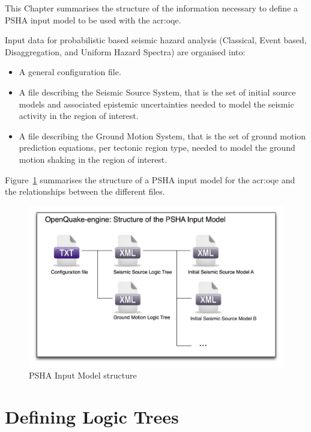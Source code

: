 This Chapter summarises the structure of the information necessary to define
a PSHA input model to be used with the \glsdesc{acr:oqe}.

Input data for probabilistic based seismic hazard analysis (Classical, Event
based, Disaggregation, and Uniform Hazard Spectra) are organised into:

\begin{itemize}

	\item A general configuration file.

    \item A file describing the Seismic Source System, that is the set of
	initial source models and associated epistemic uncertainties needed to
	model the seismic activity in the region of interest.

    \item A file describing the Ground Motion System, that is the set of
	ground motion prediction equations, per tectonic region type, needed to
	model the ground motion shaking in the region of interest.

\end{itemize}

Figure~\ref{fig:psha_input} summarises the structure of a PSHA input model
for the \glsdesc{acr:oqe} and the relationships between the different files.

\begin{figure}[!ht]
\centering
\includegraphics[width=14cm]{figures/hazard/psha_input_structure.pdf}
\caption{PSHA Input Model structure}
\label{fig:psha_input}
\end{figure}


\section{Defining Logic Trees}

\label{sec:hazard_logic_trees}

